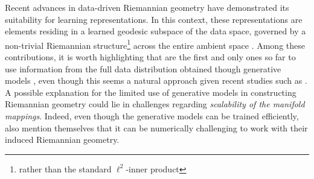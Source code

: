 Recent advances in data-driven Riemannian geometry have demonstrated its suitability for learning representations.
In this context, these representations are elements residing in a learned geodesic subspace of the data space, governed by a non-trivial Riemannian structure\footnote{rather than the standard $\ell^2$-inner product} across the entire ambient space \cite{arvanitidis2016locally,diepeveen2024pulling,hauberg2012geometric,peltonen2004improved,Scarvelis2023,sorrenson2024learningdistancesdatanormalizing,sun2024geometryaware}. 
Among these contributions, it is worth highlighting that \cite{sorrenson2024learningdistancesdatanormalizing} are the first and only ones so far to use information from the full data distribution obtained though generative models \cite{dinh2017density,song2020score}, even though this seems a natural approach given recent studies such as \cite{NEURIPS2022_4f918fa3,tempczyk2022lidl,sakamoto2024the,pmlr-v235-stanczuk24a}. A possible explanation for the limited use of generative models in constructing Riemannian geometry could lie in challenges regarding \emph{scalability of the manifold mappings}. Indeed, even though the generative models can be trained efficiently, \cite{sorrenson2024learningdistancesdatanormalizing} also mention themselves that it can be numerically challenging to work with their induced Riemannian geometry.

